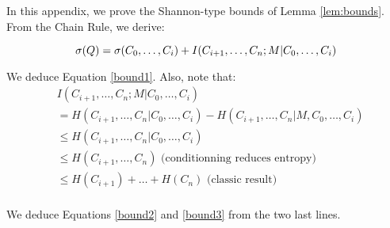 \begin{appendix}
    In this appendix, we prove the Shannon-type bounds of Lemma
\ref{lem:bounds}. From the Chain Rule, we derive:

\begin{equation*}
    \sigma(Q)  = \sigma(C_0, \ldots , C_i) +  I(C_{i+1}, \ldots, C_n ; M | C_0, \ldots , C_i)\\
\end{equation*}

We deduce Equation \ref{bound1}. Also, note that:
\begin{equation*}
\begin{split}
    & I(C_{i+1}, \ldots, C_n ; M | C_0, \ldots , C_i) \\
    &= H(C_{i+1}, \ldots, C_n | C_0, \ldots , C_i) 
        - H(C_{i+1}, \ldots, C_n | M , C_0, \ldots , C_i)\\
    & \leq H(C_{i+1}, \ldots, C_n | C_0, \ldots , C_i) \\
    & \leq H(C_{i+1}, \ldots, C_n) \text{  (conditionning reduces entropy)}\\
    & \leq H(C_{i+1}) +  \ldots +H( C_n) \text{  (classic result)}\\
\end{split}
\end{equation*}

We deduce Equations \ref{bound2} and \ref{bound3} from the two last lines.


\end{appendix}
